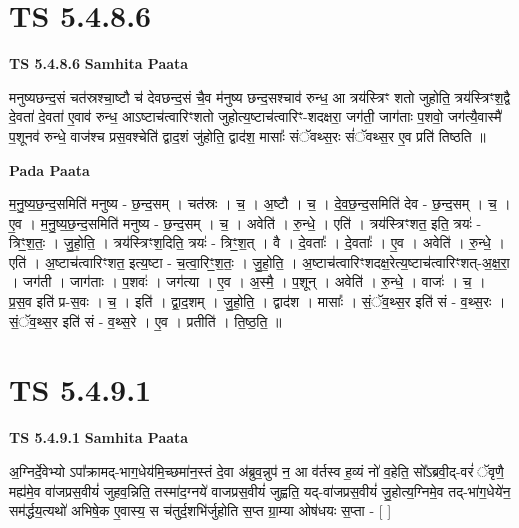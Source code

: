 \documentclass[17pt]{extarticle}
\begin{document}
\section*{ TS 5.4.8.6 }

\textbf{TS 5.4.8.6 } \newline
\textbf{Samhita Paata} \newline

मनुष्यछन्द॒सं चत॑स्रश्चा॒ष्टौ च॑ देवछन्द॒सं चै॒व म॑नुष्य छन्द॒सश्चाव॑ रुन्ध॒ आ त्रय॑स्त्रिꣳ शतो जुहोति॒ त्रय॑स्त्रिꣳश॒द्वै दे॒वता॑ दे॒वता॑ ए॒वाव॑ रुन्ध॒ आऽष्टाच॑त्वारिꣳशतो जुहोत्य॒ष्टाच॑त्वारिꣳ-शदक्षरा॒ जग॑ती॒ जाग॑ताः प॒शवो॒ जग॑त्यै॒वास्मै॑ प॒शूनव॑ रुन्धे॒ वाज॑श्च प्रस॒वश्चेति॑ द्वाद॒शं जु॑होति॒ द्वाद॑श॒ मासाः᳚ संॅवथ्स॒रः सं॑ॅवथ्स॒र ए॒व प्रति॑ तिष्ठति ॥ \newline

\textbf{Pada Paata} \newline

म॒नु॒ष्य॒छ॒न्द॒समिति॑ मनुष्य - छ॒न्द॒सम् । चत॑स्रः । च॒ । अ॒ष्टौ । च॒ । दे॒व॒छ॒न्द॒समिति॑ देव - छ॒न्द॒सम् । च॒ । ए॒व । म॒नु॒ष्य॒छ॒न्द॒समिति॑ मनुष्य - छ॒न्द॒सम् । च॒ । अवेति॑ । रु॒न्धे॒ । एति॑ । त्रय॑स्त्रिꣳशत॒ इति॒ त्रयः॑ - त्रिꣳ॒॒श॒तः॒ । जु॒हो॒ति॒ । त्रय॑स्त्रिꣳश॒दिति॒ त्रयः॑ - त्रिꣳ॒॒श॒त् । वै । दे॒वताः᳚ । दे॒वताः᳚ । ए॒व । अवेति॑ । रु॒न्धे॒ । एति॑ । अ॒ष्टाच॑त्वारिꣳशत॒ इत्य॒ष्टा - च॒त्वा॒रिꣳ॒॒श॒तः॒ । जु॒हो॒ति॒ । अ॒ष्टाच॑त्वारिꣳशदक्ष॒रेत्य॒ष्टाच॑त्वारिꣳशत्-अ॒क्ष॒रा॒ । जग॑ती । जाग॑ताः । प॒शवः॑ । जग॑त्या । ए॒व । अ॒स्मै॒ । प॒शून् । अवेति॑ । रु॒न्धे॒ । वाजः॑ । च॒ । प्र॒स॒व इति॑ प्र-स॒वः । च॒ । इति॑ । द्वा॒द॒शम् । जु॒हो॒ति॒ । द्वाद॑श । मासाः᳚ । सं॒ॅव॒थ्स॒र इति॑ सं - व॒थ्स॒रः । सं॒ॅव॒थ्स॒र इति॑ सं - व॒थ्स॒रे । ए॒व । प्रतीति॑ । ति॒ष्ठ॒ति॒ ॥  \newline




\section*{ TS 5.4.9.1 }

\textbf{TS 5.4.9.1 } \newline
\textbf{Samhita Paata} \newline

अ॒ग्निर्दे॒वेभ्यो ऽपा᳚क्रामद्-भाग॒धेय॑मि॒च्छमा॑न॒स्तं दे॒वा अ॑ब्रुव॒न्नुप॑ न॒ आ व॑र्तस्व ह॒व्यं नो॑ व॒हेति॒ सो᳚ऽब्रवी॒द्-वरं॑ ॅवृणै॒ मह्य॑मे॒व वा॑जप्रस॒वीयं॑ जुहव॒न्निति॒ तस्मा॑द॒ग्नये॑ वाजप्रस॒वीयं॑ जुह्वति॒ यद्-वा॑जप्रस॒वीयं॑ जु॒होत्य॒ग्निमे॒व तद्-भा॑ग॒धेये॑न॒ सम॑र्द्धय॒त्यथो॑ अभिषे॒क ए॒वास्य॒ स च॑तुर्द॒शभि॑र्जुहोति स॒प्त ग्रा॒म्या ओष॑धयः स॒प्ता - [  ] \newline
\end{document}
